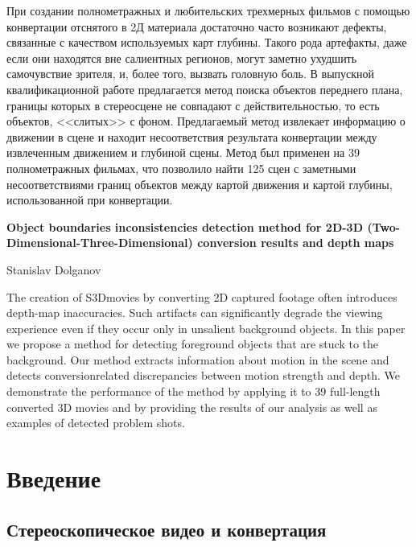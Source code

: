 \documentclass[14pt, a4paper]{extarticle}
\begin{document}
При создании полнометражных и любительских трехмерных фильмов с помощью 
конвертации отснятого в 2Д материала достаточно часто возникают дефекты, 
связанные с качеством используемых карт глубины. Такого рода артефакты, 
даже если они находятся вне салиентных регионов,  могут заметно ухудшить 
самочувствие зрителя, и, более того, вызвать головную боль. В выпускной
квалификационной работе предлагается метод поиска объектов переднего плана, границы которых 
в стереосцене не совпадают с действительностью, то есть объектов, <<слитых>> 
с фоном. Предлагаемый метод извлекает информацию о движении в сцене и 
находит несоответствия результата конвертации между извлеченным движением и глубиной сцены.
Метод был применен на 39 полнометражных фильмах, что позволило найти 125 сцен 
с заметными несоответствиями границ объектов между картой движения и картой глубины, 
использованной при конвертации.

\vspace{2cm}

\textbf{Object boundaries inconsistencies detection method 
for 2D-3D (Two-Dimensional-Three-Dimensional)
conversion results and depth maps}

\vspace{0.5cm}
Stanislav Dolganov
\vspace{0.5cm}

The creation of S3Dmovies by converting 2D captured footage
often introduces depth-map inaccuracies. Such artifacts can
significantly degrade the viewing experience even if they occur
only in unsalient background objects.
In this paper we propose a method for detecting foreground
objects that are stuck to the background. Our method extracts
information about motion in the scene and detects conversionrelated
discrepancies between motion strength and depth. We
demonstrate the performance of the method by applying it
to 39 full-length converted 3D movies and by providing the
results of our analysis as well as examples of detected problem
shots.

\newpage
{}
\tableofcontents

\newpage
\section{Введение}

\subsection{Стереоскопическое видео и конвертация}
\end{document}
